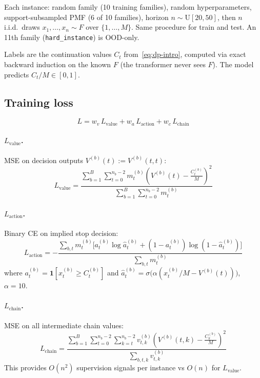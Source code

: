 Each instance: random family (10 training families), random hyperparameters, support-subsampled PMF (6 of 10 families), horizon $n \sim \mathrm{U}[20, 50]$, then $n$ i.i.d.\ draws $x_1, \ldots, x_n \sim F$ over $\{1, \ldots, M\}$. Same procedure for train and test. An 11th family (\texttt{hard\_instance}) is OOD-only.

Labels are the continuation values $C_t$ from~\eqref{eq:dp-intro}, computed via exact backward induction on the known $F$ (the transformer never sees $F$). The model predicts $C_t/M \in [0,1]$.

\subsection{Training loss}

\[
L = w_v \, L_{\mathrm{value}} + w_a \, L_{\mathrm{action}} + w_c \, L_{\mathrm{chain}}
\]

\paragraph{$L_{\mathrm{value}}$.} MSE on decision outputs $V^{(b)}(t) := V^{(b)}(t,t)$:
\[
L_{\mathrm{value}} = \frac{\displaystyle\sum_{b=1}^{B}\sum_{t=0}^{n_b-2} m_t^{(b)}\!\left(V^{(b)}(t) - \frac{C_t^{(b)}}{M}\right)^{\!2}}{\displaystyle\sum_{b=1}^{B}\sum_{t=0}^{n_b-2} m_t^{(b)}}
\]

\paragraph{$L_{\mathrm{action}}$.} Binary CE on implied stop decision:
\[
L_{\mathrm{action}} = -\frac{\displaystyle\sum_{b,t} m_t^{(b)}\!\Big[a_t^{(b)}\log\hat{a}_t^{(b)} + (1{-}a_t^{(b)})\log(1{-}\hat{a}_t^{(b)})\Big]}{\displaystyle\sum_{b,t} m_t^{(b)}}
\]
where $a_t^{(b)} = \mathbf{1}[x_t^{(b)} \ge C_t^{(b)}]$ and $\hat{a}_t^{(b)} = \sigma\!\big(\alpha(x_t^{(b)}/M - V^{(b)}(t))\big)$, $\alpha = 10$.

\paragraph{$L_{\mathrm{chain}}$.} MSE on all intermediate chain values:
\[
L_{\mathrm{chain}} = \frac{\displaystyle\sum_{b=1}^{B}\sum_{t=0}^{n_b-2}\sum_{k=t}^{n_b-2} v_{t,k}^{(b)}\!\left(V^{(b)}(t,k) - \frac{C_k^{(b)}}{M}\right)^{\!2}}{\displaystyle\sum_{b,t,k} v_{t,k}^{(b)}}
\]
This provides $O(n^2)$ supervision signals per instance vs $O(n)$ for $L_{\mathrm{value}}$.

